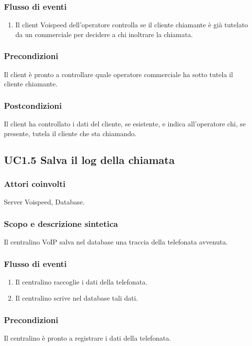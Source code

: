 \subsubsection*{Flusso di eventi}
\begin{enumerate}
\item Il client Voispeed dell'operatore controlla se il cliente chiamante \` e gi\` a tutelato da un commerciale per decidere a chi inoltrare la chiamata.
\end{enumerate}
\subsubsection*{Precondizioni} Il client \`e pronto a controllare quale operatore commerciale ha sotto tutela il cliente chiamante.
\subsubsection*{Postcondizioni} Il client ha controllato i dati del cliente, se esistente, e indica all'operatore chi, se presente, tutela il cliente che sta chiamando.

\subsection*{UC1.5 Salva il log della chiamata}
\subsubsection*{Attori coinvolti} Server Voispeed, Database.
\subsubsection*{Scopo e descrizione sintetica}
Il centralino VoIP salva nel database una traccia della telefonata avvenuta.
\subsubsection*{Flusso di eventi}
\begin{enumerate}
\item Il centralino raccoglie i dati della telefonata.
\item Il centralino scrive nel database tali dati.
\end{enumerate}
\subsubsection*{Precondizioni} Il centralino \`e pronto a registrare i dati della telefonata.
